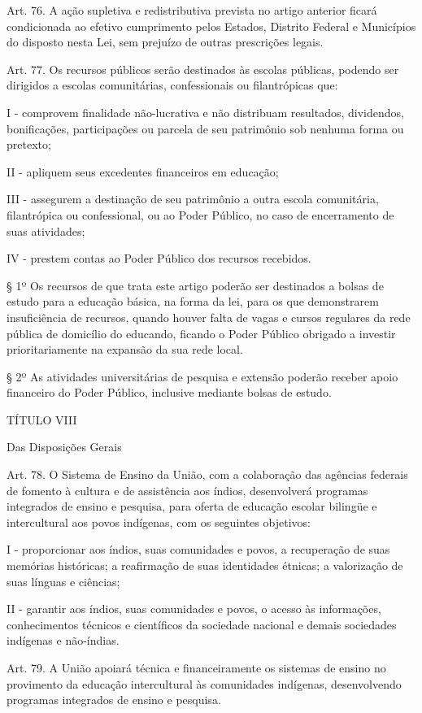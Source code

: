 \documentclass[
]{book}
\begin{document}
Art. 76. A ação supletiva e redistributiva prevista no artigo anterior ficará condicionada ao efetivo cumprimento pelos Estados, Distrito Federal e Municípios do disposto nesta Lei, sem prejuízo de outras prescrições legais.

Art. 77. Os recursos públicos serão destinados às escolas públicas, podendo ser dirigidos a escolas comunitárias, confessionais ou filantrópicas que:

I - comprovem finalidade não-lucrativa e não distribuam resultados, dividendos, bonificações, participações ou parcela de seu patrimônio sob nenhuma forma ou pretexto;

II - apliquem seus excedentes financeiros em educação;

III - assegurem a destinação de seu patrimônio a outra escola comunitária, filantrópica ou confessional, ou ao Poder Público, no caso de encerramento de suas atividades;

IV - prestem contas ao Poder Público dos recursos recebidos.

§ 1º Os recursos de que trata este artigo poderão ser destinados a bolsas de estudo para a educação básica, na forma da lei, para os que demonstrarem insuficiência de recursos, quando houver falta de vagas e cursos regulares da rede pública de domicílio do educando, ficando o Poder Público obrigado a investir prioritariamente na expansão da sua rede local.

§ 2º As atividades universitárias de pesquisa e extensão poderão receber apoio financeiro do Poder Público, inclusive mediante bolsas de estudo.

TÍTULO VIII

Das Disposições Gerais

Art. 78. O Sistema de Ensino da União, com a colaboração das agências federais de fomento à cultura e de assistência aos índios, desenvolverá programas integrados de ensino e pesquisa, para oferta de educação escolar bilingüe e intercultural aos povos indígenas, com os seguintes objetivos:

I - proporcionar aos índios, suas comunidades e povos, a recuperação de suas memórias históricas; a reafirmação de suas identidades étnicas; a valorização de suas línguas e ciências;

II - garantir aos índios, suas comunidades e povos, o acesso às informações, conhecimentos técnicos e científicos da sociedade nacional e demais sociedades indígenas e não-índias.

Art. 79. A União apoiará técnica e financeiramente os sistemas de ensino no provimento da educação intercultural às comunidades indígenas, desenvolvendo programas integrados de ensino e pesquisa.
\end{document}
